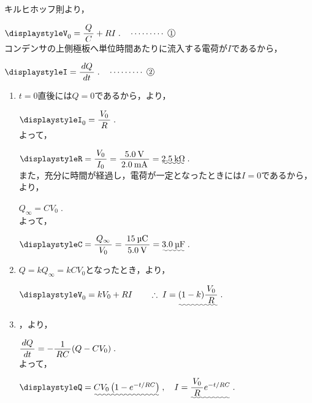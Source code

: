 ﻿\documentclass[../../../ps_a.tex]{subfiles}
\begin{document}
    キルヒホッフ則より，
    
    \myspaceb%
    $\displaystyle%
        V_0 = \myfracc{Q}{C} + RI \;.\quad\cdots\cdots\cdots\;\mynumberb{1}
    $\\
    コンデンサの上側極板へ単位時間あたりに流入する電荷が$I$であるから，
    
    \myspaceb%
    $\displaystyle%
        I = \myfracc{dQ}{dt} \;.\quad\cdots\cdots\cdots\;\mynumberb{2}
    $
    
    \begin{enumerate}
        \item $t=0$直後には$Q=0$であるから，より，
            
            \myspaceb%
            $\displaystyle%
                I_0 = \myfracc{V_0}{R} \;.
            $\\
            よって，
            
            \myspaceb%
            $\displaystyle%
                R = \myfracc{V_0}{I_0}%
                = \myfraca{5.0\:\mathrm{V}}{2.0\:\mathrm{mA}}%
                = \uwave{2.5\:\mathrm{k}\Omega} \;.
            $\\
            また，充分に時間が経過し，電荷が一定となったときには$I=0$であるから，より，
            
            \myspaceb%
            $\displaystyle%
                Q_\infty = CV_0 \;.
            $\\
            よって，
            
            \myspaceb%
            $\displaystyle%
                C = \myfracc{Q_\infty}{V_0}%
                = \myfracc{15\:\text{\textmu C}}{5.0\:\mathrm{V}}%
                = \uwave{3.0\:\text{\textmu F}} \;.
            $
        \item $Q = kQ_\infty = kCV_0$となったとき，より，
            
            \myspaceb%
            $\displaystyle%
                V_0 = kV_0 + RI%
                \qquad \therefore \; I = \uwave{(1-k) \myfracc{V_0}{R}} \;.
            $
        \item {}，より，
            
            \myspaceb%
            $\displaystyle%
                \myfracc{dQ}{dt} = - \myfraca{1}{RC} (Q-CV_0) \;.
            $\\
            よって，
            
            \myspaceb%
            $\displaystyle%
                Q = \uwave{CV_0\left( 1 - e^{-t/RC} \right)} \;,%
                \quad I = \uwave{\myfracc{V_0}{R} e^{-t/RC}} \;.
            $
    \end{enumerate}
\end{document}
